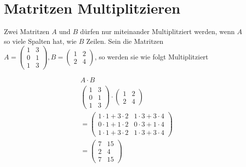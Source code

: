 \chapter{Matritzen Multiplitzieren}
\label{matrix_multiplitzieren}

Zwei Matritzen $A$ und $B$ dürfen nur miteinander Multiplitziert werden, wenn
$A$ so viele Spalten hat, wie $B$ Zeilen. Sein die Matritzen $A = \begin{pmatrix}
        1 & 3 \\
        0 & 1 \\
        1 & 3
    \end{pmatrix}, B = \begin{pmatrix}
        1 & 2 \\
        2 & 4
    \end{pmatrix}$, so werden sie wie folgt Multiplitziert

\begin{align*}
    A \cdot B                                       \\
    \begin{pmatrix}
        1 & 3 \\
        0 & 1 \\
        1 & 3
    \end{pmatrix} \cdot \begin{pmatrix}
                            1 & 2 \\
                            2 & 4
                        \end{pmatrix}              \\
    = \begin{pmatrix}
          1 \cdot 1 + 3 \cdot 2 & 1 \cdot 3 + 3 \cdot 4 \\
          0 \cdot 1 + 1 \cdot 2 & 0 \cdot 3 + 1 \cdot 4 \\
          1 \cdot 1 + 3 \cdot 2 & 1 \cdot 3 + 3 \cdot 4
      \end{pmatrix} \\
    = \begin{pmatrix}
          7 & 15 \\
          2 & 4  \\
          7 & 15
      \end{pmatrix}
\end{align*}